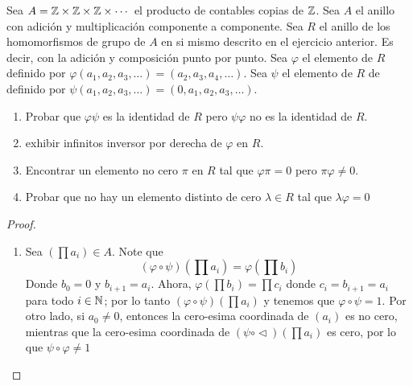 \documentclass{amsart}
\begin{document}
\begin{problem}[30]
    Sea $A = \mathbb{Z} \times \mathbb{Z} \times \mathbb{Z} \times \cdots $ el producto de contables copias de $\mathbb{Z}$. Sea $A$ el anillo con adición y multiplicación componente a componente. Sea $R$ el anillo de los homomorfismos de  grupo de $A$ en si mismo descrito en el ejercicio anterior. Es decir, con la adición y composición punto por punto. Sea $\varphi$ el elemento de $R$ definido por $\varphi(a_1,a_2,a_3,\ldots) = (a_2,a_3,a_4,\ldots)$. Sea $\psi$ el elemento de $R$ de definido por $\psi(a_1,a_2,a_3,\ldots) = (0,a_1,a_2,a_3,\ldots)$.
    \begin{enumerate}
        \item Probar que $\varphi\psi$ es la identidad de $R$ pero $\psi\varphi$ no es la identidad de $R$.
        \item exhibir infinitos inversor por derecha de $\varphi$ en $R$.
        \item Encontrar un elemento no cero $\pi$ en $R$ tal que $\varphi\pi = 0$ pero $\pi\varphi \neq 0$.
        \item Probar que no hay un elemento distinto de cero $\lambda \in R$ tal que $\lambda\varphi = 0$ 
    \end{enumerate}
\end{problem}

\begin{proof}
    \, 
    \begin{enumerate}
        \item Sea $\left( \prod a_i \right) \in A$. Note que 
        $$ (\varphi \circ \psi) \left( \prod a_i\right) = \varphi \left(\prod b_i\right)$$
        Donde $b_0 = 0$ y $b_{i+1} = a_i$. Ahora, $\varphi \left(\prod  b_i\right) = \prod c_i$ donde $c_i = b_{i+1} = a_i$ para todo $i \in \mathbb{N}$; por lo tanto $(\varphi \circ \psi) \left(\prod a_i\right)$ y tenemos que $\varphi \circ \psi = 1$. Por otro lado, si $a_0 \neq 0$, entonces la cero-esima coordinada de $\left(a_i\right)$ es no cero, mientras que la cero-esima coordinada de $(\psi\circ\vartriangleleft)\left(\prod a_i\right)$ es cero, por lo que $\psi \circ \varphi \neq 1$
        
        
    \end{enumerate}
\end{proof}
\end{document}
